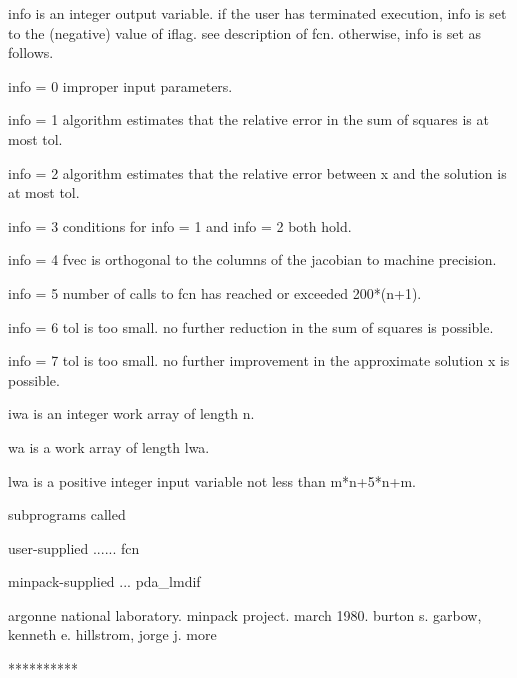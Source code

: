 \documentclass[11pt,twoside,nolof]{starlink}
\begin{document}
\begin{terminalv}
       info is an integer output variable. if the user has
         terminated execution, info is set to the (negative)
         value of iflag. see description of fcn. otherwise,
         info is set as follows.

         info = 0  improper input parameters.

         info = 1  algorithm estimates that the relative error
                   in the sum of squares is at most tol.

         info = 2  algorithm estimates that the relative error
                   between x and the solution is at most tol.

         info = 3  conditions for info = 1 and info = 2 both hold.

         info = 4  fvec is orthogonal to the columns of the
                   jacobian to machine precision.

         info = 5  number of calls to fcn has reached or
                   exceeded 200*(n+1).

         info = 6  tol is too small. no further reduction in
                   the sum of squares is possible.

         info = 7  tol is too small. no further improvement in
                   the approximate solution x is possible.

       iwa is an integer work array of length n.

       wa is a work array of length lwa.

       lwa is a positive integer input variable not less than
         m*n+5*n+m.

     subprograms called

       user-supplied ...... fcn

       minpack-supplied ... pda_lmdif

     argonne national laboratory. minpack project. march 1980.
     burton s. garbow, kenneth e. hillstrom, jorge j. more

     **********
\end{terminalv}
\end{document}
